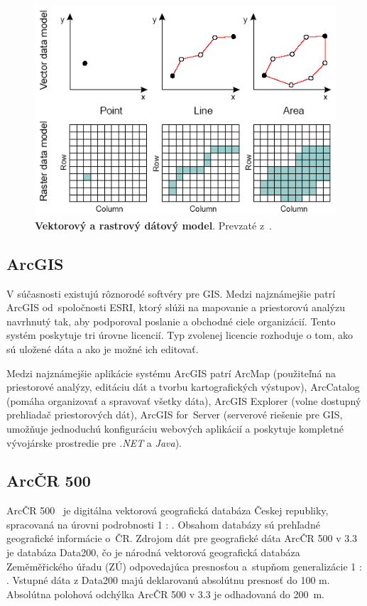 \begin{figure}[ht]
    \centering
    \includegraphics[width=0.5\linewidth]{obrazky-figures/vector-and-raster-data.png}
    \caption{\textbf{Vektorový a rastrový dátový model}. Prevzaté z~\cite{jukil2017mapdata}.}
    \label{fig:vectorandraster}
\end{figure}

\subsection{ArcGIS}
V súčasnosti existujú rôznorodé softvéry pre GIS. Medzi najznámejšie patrí ArcGIS od~spoločnosti ESRI, ktorý slúži na mapovanie a priestorovú analýzu navrhnutý tak, aby podporoval poslanie a obchodné ciele organizácií. Tento systém poskytuje tri úrovne licencií. Typ zvolenej licencie rozhoduje o tom, ako sú uložené dáta a ako je možné ich editovať. 

Medzi najznámejšie aplikácie systému ArcGIS patrí ArcMap (použiteľná na priestorové analýzy, editáciu dát a tvorbu kartografických výstupov), ArcCatalog (pomáha organizovať a spravovať všetky dáta), ArcGIS Explorer (volne dostupný prehliadač priestorových dát), ArcGIS for~Server (serverové riešenie pre GIS, umožňuje jednoduchú konfiguráciu webových aplikácií a poskytuje kompletné vývojárske prostredie pre \emph{.NET} a \emph{Java}).

\subsection{ArcČR 500}
ArcČR 500~\cite{arcgis} je digitálna vektorová geografická databáza Českej republiky, spracovaná na úrovni podrobnosti 1 : . Obsahom databázy sú prehľadné geografické informácie o~ČR. Zdrojom dát pre geografické dáta ArcČR 500 v 3.3 je databáza Data200, čo je národná vektorová geografická databáza Zeměměřického úřadu (ZÚ) odpovedajúca presnosťou a~stupňom generalizácie 1 : . Vstupné dáta z Data200 majú deklarovanú absolútnu presnosť do 100 m. Absolútna polohová odchýlka ArcČR 500 v 3.3 je odhadovaná do 200~m.

